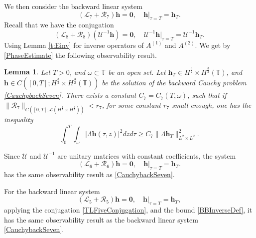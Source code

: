 \documentclass[12pt]{amsart}
\newtheorem{lemma}[theorem]{Lemma}
\theoremstyle{remark}
\theoremstyle{definition}
\numberwithin{equation}{section}
\newcommand{\f}{\frac}
\newcommand{\T}{{\mathbb T}}
\newcommand{\mL}{\mathcal{L}}
\newcommand{\mR}{\mathcal{R}}
\newcommand{\mU}{\mathcal{U}}
\begin{document}
We then consider the backward linear system 
\begin{equation} \label{CauchybackSeven}
  (\mL_7 + \mR_7) \mathbf{h} = \mathbf{0}, \quad \mathbf{h}|_{\tau=T} = \mathbf{h}_T.
\end{equation}
Recall that we have the conjugation
\begin{equation*} 
 (\mL_8 + \mR_8) (\mU^{-1}\mathbf{h}) = \mathbf{0}, \quad \mU^{-1}\mathbf{h}|_{\tau=T} = \mU^{-1}\mathbf{h}_{T}.  
\end{equation*}
Using Lemma \ref{t:Einv} for inverse operators of $A^{(1)}$ and $A^{(2)}$.
We get by \eqref{PhaseEstimate} the following observability result.

\begin{lemma} \label{t:ObserveSeven}
Let $T>0$, and $\omega \subset \T$ be an open set.
Let $\textbf{h}_T \in H^{\f32} \times H^{\f32}(\T)$, and $\textbf{h} \in C([0,T]; H^{\f32}\times H^{\f32}(\T))$ be the solution of the backward Cauchy problem \eqref{CauchybackSeven}.
There exists a constant $C_7 = C_7(T,\omega)$, such that if $\| \mR_7\|_{C([0,T]; \mL(H^{\f32}\times H^{\f32}))}< r_7$, for some constant $r_7$ small enough, one has the inequality
\begin{equation}\label{ObserveSeven}
    \int_0^T \int_\omega |\Lambda\mathbf{h}(\tau,z)|^2 dzd\tau \geq C_7 \| \Lambda\mathbf{h}_{T}\|_{L^2\times L^2}^2.
\end{equation}
\end{lemma}

Since $\mU$ and $\mU^{-1}$ are unitary matrices with constant coefficients, the system
\begin{equation*} 
  (\mL_6 + \mR_6)\mathbf{h} = \mathbf{0}, \quad \mathbf{h}|_{\tau=T} = \mathbf{h}_{T}. 
\end{equation*}
has the same observability result as \eqref{CauchybackSeven}.

For the backward linear system 
\begin{equation*} 
  (\mL_5 + \mR_5) \mathbf{h} = \mathbf{0}, \quad \mathbf{h}|_{\tau=T} = \mathbf{h}_{T},
\end{equation*}
applying the conjugation \eqref{TLFiveConjugation}, and the bound 
\eqref{BBInverseDef}, it has the same observability result as the backward linear system \eqref{CauchybackSeven}.
\end{document}
